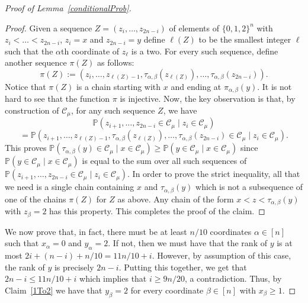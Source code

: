 \documentclass[11 pt]{article}
\theoremstyle{definition}
\theoremstyle{case}
\numberwithin{equation}{section}
\begin{document}
\begin{proof}[Proof of Lemma~\ref{conditionalProb}]
\begin{proof}
Given a sequence $Z=(z_i,\dots,z_{2n-i})$ of elements of $\{0,1,2\}^n$ with $z_i<\dots<z_{2n-i}$, $z_i=x$ and $z_{2n-i}=y$ define $\ell(Z)$ to be the smallest integer $\ell$ such that the $\alpha$th coordinate of $z_\ell$ is a two. For every such sequence, define another sequence $\pi(Z)$ as follows:
\[\pi(Z):=\left(z_i,\dots,z_{\ell(Z)-1},\tau_{\alpha,\beta}\left(z_{\ell(Z)}\right),\dots,\tau_{\alpha,\beta}\left(z_{2n-i}\right)\right).\]
Notice that $\pi(Z)$ is a chain starting with $x$ and ending at $\pi_{\alpha,\beta}(y)$. It is not hard to see that the function $\pi$ is injective. Now, the key observation is that, by construction of $\mathcal{C}_\mu$, for any such sequence $Z$, we have
\[\mathbb{P}\left(z_{i+1},\dots,z_{2n-i}\in \mathcal{C}_\mu\mid z_i\in\mathcal{C}_\mu\right)\]
\[ =\mathbb{P}\left(z_{i+1},\dots,z_{\ell(Z)-1},\tau_{\alpha,\beta}\left(z_{\ell(Z)}\right),\dots,\tau_{\alpha,\beta}\left(z_{2n-i}\right)\in \mathcal{C}_\mu\mid z_i\in\mathcal{C}_\mu\right).\]
This proves $\mathbb{P}\left(\tau_{\alpha,\beta}(y)\in\mathcal{C}_\mu\mid x\in\mathcal{C}_\mu\right)\geq \mathbb{P}\left(y\in\mathcal{C}_\mu\mid x\in\mathcal{C}_\mu\right)$ since $\mathbb{P}\left(y\in \mathcal{C}_\mu\mid x\in\mathcal{C}_\mu\right)$ is equal to the sum over all such sequences of $\mathbb{P}\left(z_{i+1},\dots,z_{2n-i}\in \mathcal{C}_\mu\mid z_i\in\mathcal{C}_\mu\right)$. In order to prove the strict inequality, all that we need is a single chain containing $x$ and $\tau_{\alpha,\beta}(y)$ which is not a subsequence of one of the chains $\pi(Z)$ for $Z$ as above. Any chain of the form $x<z<\tau_{\alpha,\beta}(y)$ with $z_\beta=2$ has this property. This completes the proof of the claim.
\end{proof}

We now prove that, in fact, there must be at least $n/10$ coordinates $\alpha\in[n]$ such that $x_\alpha=0$ and $y_\alpha=2$. If not, then we must have that the rank of $y$ is at most $2i + (n-i) + n/10 = 11n/10+i$. However, by assumption of this case, the rank of $y$ is precisely $2n-i$. Putting this together, we get that $2n-i\leq 11n/10 +i$ which implies that $i\geq 9n/20$, a contradiction. Thus, by Claim~\ref{1To2} we have that $y_\beta=2$ for every coordinate $\beta\in[n]$ with $x_\beta\geq 1$. 


\end{proof}
\end{document}
